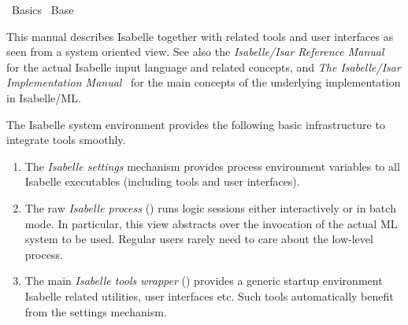 %
\begin{isabellebody}%
\def\isabellecontext{Basics}%
%
\isadelimtheory
%
\endisadelimtheory
%
\isatagtheory
{}\isamarkupfalse%
\ Basics\isanewline
{}\ Base\isanewline
{}%
\endisatagtheory
{\isafoldtheory}%
%
\isadelimtheory
%
\endisadelimtheory
%
\isamarkuptrue%
%
\begin{isamarkuptext}%
This manual describes Isabelle together with related tools and
  user interfaces as seen from a system oriented view.  See also the
  \emph{Isabelle/Isar Reference Manual}~\cite{isabelle-isar-ref} for
  the actual Isabelle input language and related concepts, and
  \emph{The Isabelle/Isar Implementation
  Manual}~\cite{isabelle-implementation} for the main concepts of the
  underlying implementation in Isabelle/ML.

  \medskip The Isabelle system environment provides the following
  basic infrastructure to integrate tools smoothly.

  \begin{enumerate}

  \item The \emph{Isabelle settings} mechanism provides process
  environment variables to all Isabelle executables (including tools
  and user interfaces).

  \item The raw \emph{Isabelle process} (\hyperlink{executable.isabelle-process}{\mbox{}}) runs logic sessions either interactively or in
  batch mode.  In particular, this view abstracts over the invocation
  of the actual ML system to be used.  Regular users rarely need to
  care about the low-level process.

  \item The main \emph{Isabelle tools wrapper} (\hyperlink{executable.isabelle}{\mbox{}}) provides a generic startup environment Isabelle related
  utilities, user interfaces etc.  Such tools automatically benefit
  from the settings mechanism.


\end{enumerate}
\end{isamarkuptext}
\end{isabellebody}
